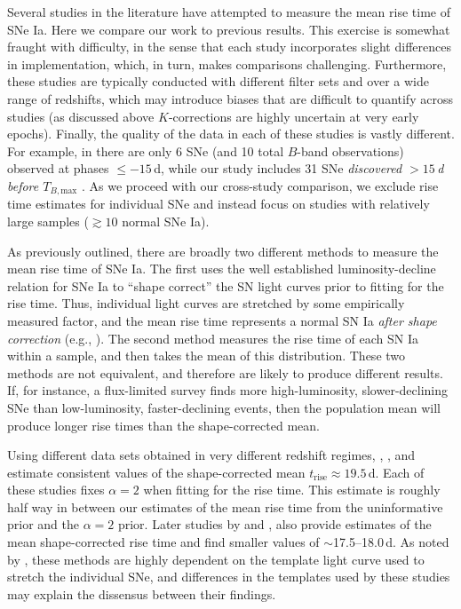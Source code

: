 \documentclass[twocolumn]{aastex63}
\newcommand{\trise}{$t_\mathrm{rise}$}
\newcommand{\tbmax}{$T_{B,\mathrm{max}}$}
\begin{document}
Several studies in the literature have attempted to measure the mean rise time
of SNe Ia. Here we compare our work to previous results. This exercise is
somewhat fraught with difficulty, in the sense that each study incorporates
slight differences in implementation, which, in turn, makes comparisons
challenging. Furthermore, these studies are typically conducted with different
filter sets and over a wide range of redshifts, which may introduce biases
that are difficult to quantify across studies (as discussed above
$K$-corrections are highly uncertain at very early epochs). Finally, the
quality of the data in each of these studies is vastly different. For example,
in \citet{Riess99a} there are only 6 SNe (and 10 total $B$-band observations)
observed at phases $\le -15$\,d, while our study includes 31 SNe
\textit{discovered $> 15$\,d before \tbmax} \citep{Yao19}. As we proceed with
our cross-study comparison, we exclude rise time estimates for individual SNe
and instead focus on studies with relatively large samples ($\gtrsim 10$
normal SNe Ia).

As previously outlined, there are broadly two different methods to measure the
mean rise time of SNe Ia. The first uses the well established
luminosity-decline relation for SNe Ia \citep{Phillips93} to ``shape correct''
the SN light curves prior to fitting for the rise time. Thus, individual light
curves are stretched by some empirically measured factor, and the mean rise
time represents a normal SN Ia \textit{after shape correction} (e.g.,
\citealt{Riess99a,Aldering00,Conley06,Hayden10,Ganeshalingam11}). The second
method measures the rise time of each SN Ia within a sample, and then takes
the mean of this distribution. These two methods are not equivalent, and
therefore are likely to produce different results. If, for instance, a
flux-limited survey finds more high-luminosity, slower-declining SNe than
low-luminosity, faster-declining events, then the population mean will produce
longer rise times than the shape-corrected mean.

Using different data sets obtained in very different redshift regimes,
\citet{Riess99a}, \citet{Aldering00}, and \citet{Conley06} estimate consistent
values of the shape-corrected mean \trise$ \approx 19.5$\,d. Each of these
studies fixes $\alpha = 2$ when fitting for the rise time. This estimate is
roughly half way in between our estimates of the mean rise time from the
uninformative prior and the $\alpha = 2$ prior. Later studies by
\citet{Hayden10} and \citet{Ganeshalingam11}, also provide estimates of the
mean shape-corrected rise time and find smaller values of $\sim$17.5--18.0\,d.
As noted by \citeauthor{Hayden10}, these methods are highly dependent on the
template light curve used to stretch the individual SNe, and differences in
the templates used by these studies may explain the dissensus between their
findings.
\end{document}
